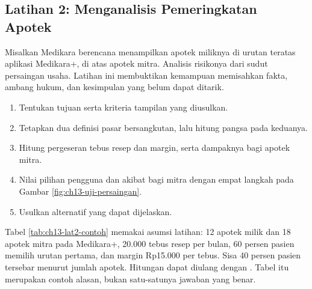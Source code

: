 \subsection*{Latihan 2: Menganalisis Pemeringkatan Apotek}

Misalkan Medikara berencana menampilkan apotek miliknya di urutan teratas aplikasi Medikara+, di atas apotek mitra. Analisis risikonya dari sudut persaingan usaha. Latihan ini membuktikan kemampuan memisahkan fakta, ambang hukum, dan kesimpulan yang belum dapat ditarik.

\begin{enumerate}
  \item Tentukan tujuan serta kriteria tampilan yang diusulkan.
  \item Tetapkan dua definisi pasar bersangkutan, lalu hitung pangsa pada keduanya.
  \item Hitung pergeseran tebus resep dan margin, serta dampaknya bagi apotek mitra.
  \item Nilai pilihan pengguna dan akibat bagi mitra dengan empat langkah pada Gambar \ref{fig:ch13-uji-persaingan}.
  \item Usulkan alternatif yang dapat dijelaskan.
\end{enumerate}

Tabel \ref{tab:ch13-lat2-contoh} memakai asumsi latihan: 12 apotek milik dan 18 apotek mitra pada Medikara+, 20.000 tebus resep per bulan, 60 persen pasien memilih urutan pertama, dan margin Rp15.000 per tebus. Sisa 40 persen pasien tersebar menurut jumlah apotek. Hitungan dapat diulang dengan . Tabel itu merupakan contoh alasan, bukan satu-satunya jawaban yang benar.

